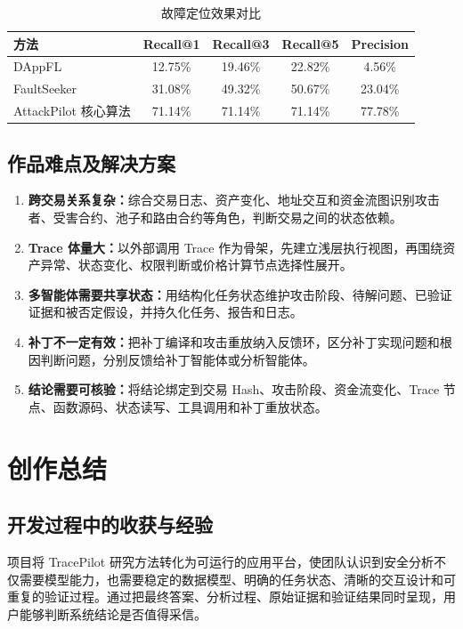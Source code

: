\documentclass[UTF8,a4paper,12pt]{ctexart}
\begin{document}
\begin{table}[H]
  \centering
  \caption{故障定位效果对比}
  \begin{tabular}{lcccc}
    \toprule
    方法 & Recall@1 & Recall@3 & Recall@5 & Precision \\
    \midrule
    DAppFL & 12.75\% & 19.46\% & 22.82\% & 4.56\% \\
    FaultSeeker & 31.08\% & 49.32\% & 50.67\% & 23.04\% \\
    AttackPilot 核心算法 & 71.14\% & 71.14\% & 71.14\% & 77.78\% \\
    \bottomrule
  \end{tabular}
\end{table}

\subsection{作品难点及解决方案}

\begin{enumerate}[leftmargin=2.8em]
  \item \textbf{跨交易关系复杂：}综合交易日志、资产变化、地址交互和资金流图识别攻击者、受害合约、池子和路由合约等角色，判断交易之间的状态依赖。
  \item \textbf{Trace 体量大：}以外部调用 Trace 作为骨架，先建立浅层执行视图，再围绕资产异常、状态变化、权限判断或价格计算节点选择性展开。
  \item \textbf{多智能体需要共享状态：}用结构化任务状态维护攻击阶段、待解问题、已验证证据和被否定假设，并持久化任务、报告和日志。
  \item \textbf{补丁不一定有效：}把补丁编译和攻击重放纳入反馈环，区分补丁实现问题和根因判断问题，分别反馈给补丁智能体或分析智能体。
  \item \textbf{结论需要可核验：}将结论绑定到交易 Hash、攻击阶段、资金流变化、Trace 节点、函数源码、状态读写、工具调用和补丁重放状态。
\end{enumerate}

\section{创作总结}

\subsection{开发过程中的收获与经验}

项目将 TracePilot 研究方法转化为可运行的应用平台，使团队认识到安全分析不仅需要模型能力，也需要稳定的数据模型、明确的任务状态、清晰的交互设计和可重复的验证过程。通过把最终答案、分析过程、原始证据和验证结果同时呈现，用户能够判断系统结论是否值得采信。
\end{document}
